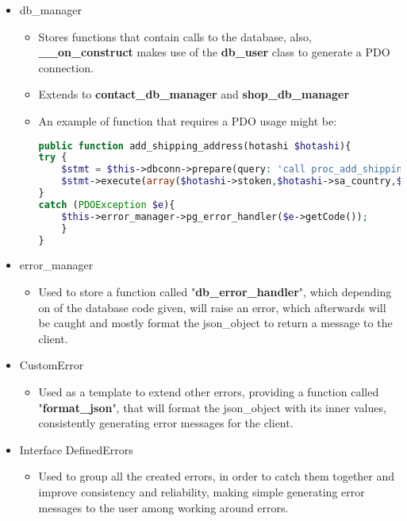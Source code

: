 \begin{flushleft}
\begin{itemize}
        \item db\_manager
        \begin{itemize}
            \item Stores functions that contain calls to the database, also, \textbf{\_\_on\_construct} makes use of the \textbf{db\_user}  class to generate a PDO connection.
            \item Extends to \textbf{contact\_db\_manager} and \textbf{shop\_db\_manager}
            \item \begin{flushleft}
                An example of function that requires a PDO usage might be:
                \begin{lstlisting}[language=php,label={lst:php_pdo_query_example}]
public function add_shipping_address(hotashi $hotashi){
try {
    $stmt = $this->dbconn->prepare(query: 'call proc_add_shipping_address_from_stoken(?,?,?,?,?,?,?);');
    $stmt->execute(array($hotashi->stoken,$hotashi->sa_country,$hotashi->sa_city,$hotashi->sa_pcode,$hotashi->sa_add1,$hotashi->sa_add2,$hotashi->sa_add3));
}
catch (PDOException $e){
    $this->error_manager->pg_error_handler($e->getCode());
    }
}
                \end{lstlisting}
            \end{flushleft}
        \end{itemize}
    \end{itemize}
    \begin{itemize}
        \item error\_manager
        \begin{itemize}
            \item Used to store a function called "\textbf{db\_error\_handler}", which depending on of the database
            code given, will raise an error, which afterwards will be caught and mostly format the json\_object to
            return a message to the client.
        \end{itemize}
    \end{itemize}
    \begin{itemize}
        \item CustomError
        \begin{itemize}
            \item Used as a template to extend other errors, providing a function called "\textbf{format\_json}", that
            will format the json\_object with its inner values, consistently generating error messages for the client.
        \end{itemize}
    \end{itemize}
    \begin{itemize}
        \item Interface DefinedErrors
        \begin{itemize}
            \item Used to group all the created errors, in order to catch them together and improve consistency and
            reliability, making simple generating error messages to the user among working around errors.
        \end{itemize}
    \end{itemize}
\end{flushleft}